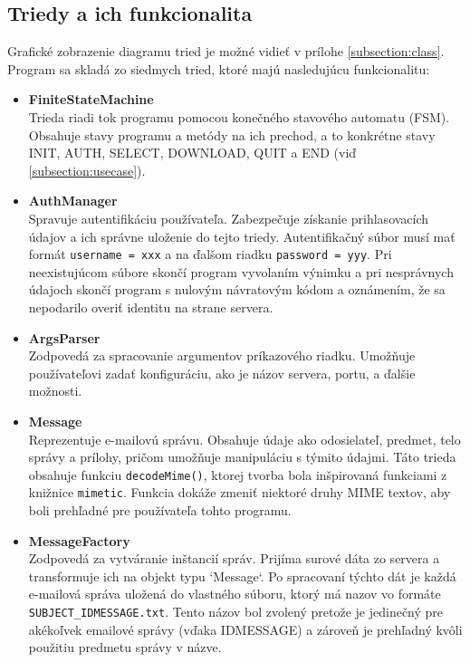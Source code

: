 \documentclass[a4paper, 11pt]{article}
\begin{document}
	\subsection{Triedy a ich funkcionalita}
	Grafické zobrazenie diagramu tried je možné vidieť v prílohe \ref{subsection:class}. Program sa skladá zo siedmych tried, ktoré majú nasledujúcu funkcionalitu:
	\begin{itemize}
		\item \textbf{FiniteStateMachine} \\
		Trieda riadi tok programu pomocou konečného stavového automatu (FSM). Obsahuje stavy programu a metódy na ich prechod, a to konkrétne stavy INIT, AUTH, SELECT, DOWNLOAD, QUIT a END (viď \ref{subsection:usecase}).
	
		\item \textbf{AuthManager} \\
		Spravuje autentifikáciu používateľa. Zabezpečuje získanie prihlasovacích údajov a ich správne uloženie do tejto triedy. Autentifikačný súbor musí mať formát \texttt{username =  xxx} a na ďalšom riadku \texttt{password =  yyy}. Pri neexistujúcom súbore skončí program vyvolaním výnimku a pri nesprávnych údajoch skončí program s nulovým návratovým kódom a oznámením, že sa nepodarilo overiť identitu na strane servera.
	
		\item \textbf{ArgsParser} \\
		Zodpovedá za spracovanie argumentov príkazového riadku. Umožňuje používateľovi zadať konfiguráciu, ako je názov servera, portu, a ďalšie možnosti.
	
		\item \textbf{Message} \\
		Reprezentuje e-mailovú správu. Obsahuje údaje ako odosielateľ, predmet, telo správy a prílohy, pričom umožňuje manipuláciu s týmito údajmi. Táto trieda obsahuje funkciu \texttt{decodeMime()}, ktorej tvorba bola inšpirovaná funkciami z knižnice \texttt{mimetic}. Funkcia dokáže zmeniť niektoré druhy MIME textov, aby boli prehľadné pre používateľa tohto programu.
	
		\item \textbf{MessageFactory} \\
		Zodpovedá za vytváranie inštancií správ. Prijíma surové dáta zo servera a transformuje ich na objekt typu `Message`. Po spracovaní týchto dát je každá e-mailová správa uložená do vlastného súboru, ktorý má nazov vo formáte \texttt{SUBJECT\_IDMESSAGE.txt}. Tento názov bol zvolený pretože je jedinečný pre akékoľvek emailové správy (vďaka IDMESSAGE) a zároveň je prehľadný kvôli použitiu predmetu správy v názve.
	

\end{itemize}
\end{document}

